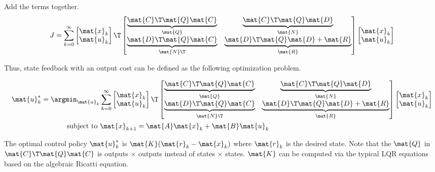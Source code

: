 Add the terms together.
\begin{equation}
  J = \sum_{k=0}^\infty
  \begin{bmatrix}
    \mat{x}_k \\
    \mat{u}_k
  \end{bmatrix}\T
  \begin{bmatrix}
    \underbrace{\mat{C}\T\mat{Q}\mat{C}}_{\mat{Q}} &
    \underbrace{\mat{C}\T\mat{Q}\mat{D}}_{\mat{N}} \\
    \underbrace{\mat{D}\T\mat{Q}\mat{C}}_{\mat{N}\T} &
    \underbrace{\mat{D}\T\mat{Q}\mat{D} + \mat{R}}_{\mat{R}}
  \end{bmatrix}
  \begin{bmatrix}
    \mat{x}_k \\
    \mat{u}_k
  \end{bmatrix}
\end{equation}

Thus, state feedback with an output cost can be defined as the following
optimization problem.
\begin{theorem}
  \begin{align}
    \mat{u}_k^* = \argmin_{\mat{u}_k} &\sum_{k=0}^\infty
    \begin{bmatrix}
      \mat{x}_k \\
      \mat{u}_k
    \end{bmatrix}\T
    \begin{bmatrix}
      \underbrace{\mat{C}\T\mat{Q}\mat{C}}_{\mat{Q}} &
      \underbrace{\mat{C}\T\mat{Q}\mat{D}}_{\mat{N}} \\
      \underbrace{\mat{D}\T\mat{Q}\mat{C}}_{\mat{N}\T} &
      \underbrace{\mat{D}\T\mat{Q}\mat{D} + \mat{R}}_{\mat{R}}
    \end{bmatrix}
    \begin{bmatrix}
      \mat{x}_k \\
      \mat{u}_k
    \end{bmatrix}
    \nonumber \\
    \text{subject to } &\mat{x}_{k+1} = \mat{A}\mat{x}_k + \mat{B}\mat{u}_k
  \end{align}

  The optimal control policy $\mat{u}_k^*$ is $\mat{K}(\mat{r}_k - \mat{x}_k)$
  where $\mat{r}_k$ is the desired state. Note that the $\mat{Q}$ in
  $\mat{C}\T\mat{Q}\mat{C}$ is outputs $\times$ outputs instead of states
  $\times$ states. $\mat{K}$ can be computed via the typical LQR equations based
  on the algebraic Ricatti equation.
\end{theorem}

